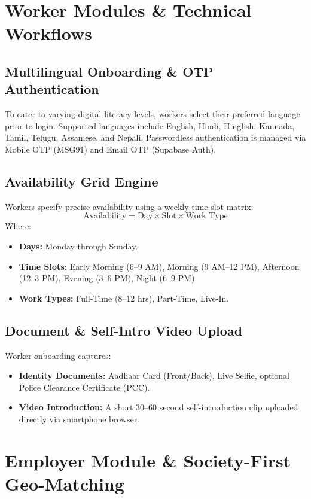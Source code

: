 \documentclass[11pt,a4paper]{article}
\begin{document}
\section{Worker Modules \& Technical Workflows}

\subsection{Multilingual Onboarding \& OTP Authentication}
To cater to varying digital literacy levels, workers select their preferred language prior to login. Supported languages include English, Hindi, Hinglish, Kannada, Tamil, Telugu, Assamese, and Nepali. Passwordless authentication is managed via Mobile OTP (MSG91) and Email OTP (Supabase Auth).

\subsection{Availability Grid Engine}
Workers specify precise availability using a weekly time-slot matrix:
\begin{equation*}
\text{Availability} = \text{Day} \times \text{Slot} \times \text{Work Type}
\end{equation*}
Where:
\begin{itemize}[noitemsep]
    \item \textbf{Days:} Monday through Sunday.
    \item \textbf{Time Slots:} Early Morning (6--9 AM), Morning (9 AM--12 PM), Afternoon (12--3 PM), Evening (3--6 PM), Night (6--9 PM).
    \item \textbf{Work Types:} Full-Time (8--12 hrs), Part-Time, Live-In.
\end{itemize}

\subsection{Document \& Self-Intro Video Upload}
Worker onboarding captures:
\begin{itemize}[noitemsep]
    \item \textbf{Identity Documents:} Aadhaar Card (Front/Back), Live Selfie, optional Police Clearance Certificate (PCC).
    \item \textbf{Video Introduction:} A short 30--60 second self-introduction clip uploaded directly via smartphone browser.
\end{itemize}

\section{Employer Module \& Society-First Geo-Matching}
\end{document}
